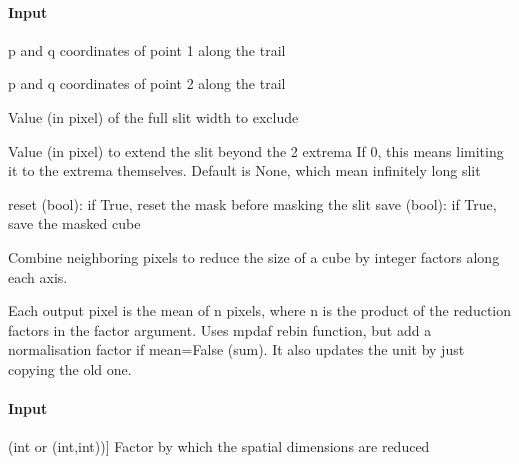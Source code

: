 \documentclass[letterpaper,10pt,english]{sphinxmanual}
\begin{document}
\begin{fulllineitems}
\begin{fulllineitems}
\paragraph{Input}
\label{\detokenize{api/pymusepipe:id92}}\begin{description}
\sphinxAtStartPar
p and q coordinates of point 1 along the trail

\sphinxAtStartPar
p and q coordinates of point 2 along the trail

\sphinxAtStartPar
Value (in pixel) of the full slit width to exclude

\sphinxAtStartPar
Value (in pixel) to extend the slit beyond the 2 extrema
If 0, this means limiting it to the extrema themselves.
Default is None, which mean infinitely long slit

\end{description}

\sphinxAtStartPar
reset (bool): if True, reset the mask before masking the slit
save (bool): if True, save the masked cube

\end{fulllineitems}


\begin{fulllineitems}
\label{\detokenize{api/pymusepipe:pymusepipe.mpdaf_pipe.MuseCube.rebin_spatial}}
\pysigstartsignatures
{}
\pysigstopsignatures
\sphinxAtStartPar
Combine neighboring pixels to reduce the size of a cube by integer factors along each axis.

\sphinxAtStartPar
Each output pixel is the mean of n pixels, where n is the product of the
reduction factors in the factor argument.
Uses mpdaf rebin function, but add a normalisation factor if mean=False (sum).
It also updates the unit by just copying the old one.


\paragraph{Input}
\label{\detokenize{api/pymusepipe:id93}}\begin{description}
\sphinxlineitem{factor}{[}(int or (int,int)){]}
\sphinxAtStartPar
Factor by which the spatial dimensions are reduced


\end{description}
\end{fulllineitems}
\end{fulllineitems}
\end{document}
